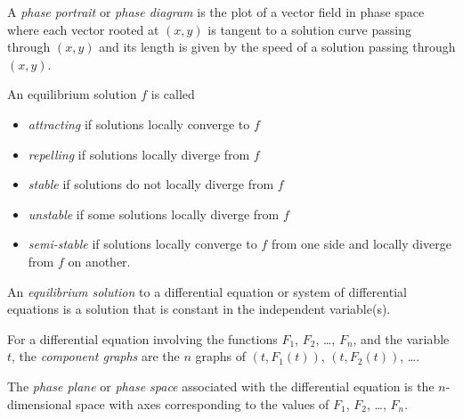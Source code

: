 \begin{SaveDefinition}[key=PhasePortrait, title={Phase Portrait}]
		A \emph{phase portrait} or \emph{phase diagram} is the plot of a vector field in phase space
		where each vector rooted at $(x,y)$ is tangent to a solution curve passing through $(x,y)$
		and its length is given by the speed of a solution passing through $(x,y)$.
\end{SaveDefinition}
\begin{SaveDefinition}[key=ClassificationOfEquilibria, title={Classification of Equilibria}]
		An equilibrium solution \emph{$f$} is called
		\begin{itemize}
			\item \emph{attracting} if solutions locally converge to $f$
			\item \emph{repelling} if solutions locally diverge from $f$
			\item \emph{stable} if solutions do not locally diverge from $f$
			\item \emph{unstable} if some solutions locally diverge from $f$
			\item \emph{semi-stable} if solutions locally converge to $f$ from one side and
			locally diverge from $f$ on another.
		\end{itemize}
\end{SaveDefinition}

\begin{SaveDefinition}[key=EquilibriumSolution, title={Equilibrium Solution}]
	An \emph{equilibrium solution} to a differential equation or system of differential equations is a
	solution that is constant in the independent variable(s).
\end{SaveDefinition}

\begin{SaveDefinition}[key=ComponentGraphAndPhasePlane, title={Component Graph \& Phase Plane}]
	For a differential equation involving the functions $F_1$, $F_2$, \ldots, $F_n$, and the variable $t$,
	the \emph{component graphs} are the $n$ graphs of $(t, F_1(t))$, $(t, F_2(t))$, \ldots.
	
	The \emph{phase plane} or \emph{phase space} associated with the differential equation
	is the $n$-dimensional space with axes corresponding to
	the values of $F_1$, $F_2$, \ldots, $F_n$.
\end{SaveDefinition}



